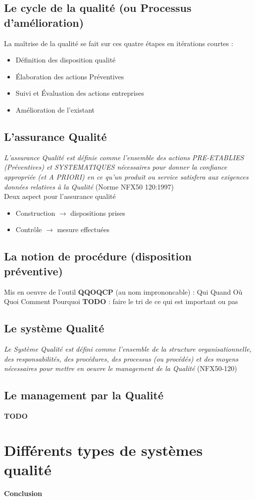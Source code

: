 	\subsection{Le cycle de la qualité (ou Processus d'amélioration)}
La maîtrise de la qualité se fait sur ces quatre étapes en itérations courtes : 
	\begin{itemize}
	\item Définition des disposition qualité
	\item Élaboration des actions Préventives
	\item Suivi et Évaluation des actions entreprises
	\item Amélioration de l’existant
	\end{itemize}

	\subsection{L'assurance Qualité}
\textit{L'assurance Qualité est définie comme l'ensemble des actions PRE-ETABLIES (Préventives) et SYSTEMATIQUES nécessaires pour donner la confiance appropriée (et A PRIORI) en ce qu'un produit ou service satisfera aux exigences données relatives à la Qualité} (Norme NFX50 120:1997)\\
Deux aspect pour l’assurance qualité
\begin{itemize}
\item Construction $\rightarrow$ dispositions prises
\item Contrôle $\rightarrow$ mesure effectuées
\end{itemize}



	\subsection{La notion de procédure (disposition préventive)}
Mis en oeuvre de l’outil \textbf{QQOQCP} (au nom imprononcable) : Qui Quand Où Quoi Comment Pourquoi
\textbf{TODO} : faire le tri de ce qui est important ou pas

	\subsection{Le système Qualité}
\textit{Le Système Qualité est défini comme l'ensemble de la structure organisationnelle,
des responsabilités, des procédures, des processus (ou procédés) et des moyens
nécessaires pour mettre en oeuvre le management de la Qualité }(NFX50-120)


	\subsection{Le management par la Qualité}
\textbf{TODO}

\section{Différents types de systèmes qualité}

\textbf{Conclusion}
